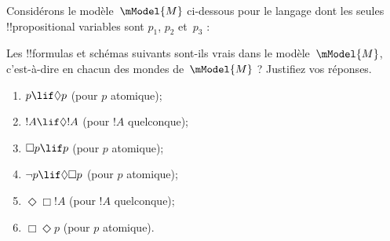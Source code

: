 \documentclass[../../../include/open-logic-section]{subfiles}
\begin{document}
\begin{prob}
  Considérons le modèle~$\mModel{M}$ ci-dessous pour le langage
  dont les seules !!{propositional variable}s sont $p_1$, $p_2$
  et~$p_3$ :
  \begin{center}
  \end{center}
  Les !!{formula}s et schémas suivants sont-ils vrais dans le
  modèle~$\mModel{M}$, c'est-à-dire en chacun des mondes
  de~$\mModel{M}$ ?
  Justifiez vos réponses.
  \begin{enumerate}
  \item $p\lif \Diamond p$ (pour $p$ atomique);
  \item $!A\lif \Diamond !A$ (pour $!A$ quelconque);
  \item $\Box p \lif p$ (pour $p$ atomique);
  \item $\lnot p \lif \Diamond \Box p$ (pour $p$ atomique);
  \item $\Diamond \Box !A$ (pour $!A$ quelconque);
  \item $\Box \Diamond p$ (pour $p$ atomique).
  \end{enumerate}
\end{prob}
\end{document}
